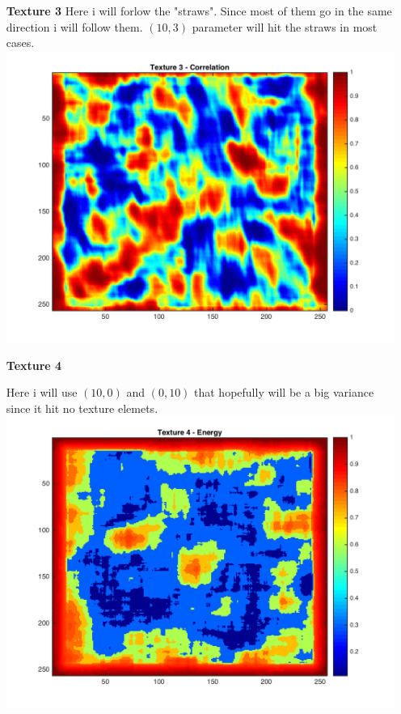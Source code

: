 \documentclass{article}
\begin{document}
\begin{itemize}
\item[\textbf{Texture 3}]
Here i will forlow the "straws". Since most of them go in the same direction i will follow them. $(10,3)$ parameter will hit the straws in most cases. \\
\includegraphics[totalheight=5cm]{t3plot.png}

\item[\textbf{Texture 4}]

Here i will use $(10, 0)$ and $(0, 10)$ that hopefully will be a big variance since it hit no texture elemets. 
\\
\includegraphics[totalheight=5cm]{t4plot.png}


\end{itemize}
\end{document}
